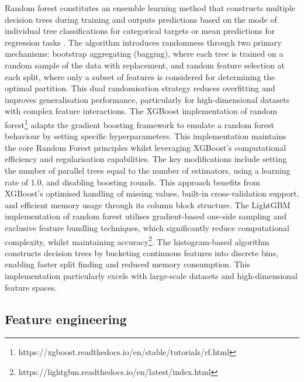 \documentclass[nhess, manuscript]{copernicus}
\begin{document}
Random forest constitutes an ensemble learning method that constructs multiple decision trees during training and outputs predictions based on the mode of individual tree classifications for categorical targets or mean predictions for regression tasks \citep{Liu_2012}. The algorithm introduces randomness through two primary mechanisms: bootstrap aggregating (bagging), where each tree is trained on a random sample of the data with replacement, and random feature selection at each split, where only a subset of features is considered for determining the optimal partition. This dual randomisation strategy reduces overfitting and improves generalisation performance, particularly for high-dimensional datasets with complex feature interactions. The XGBoost implementation of random forest\footnote{https://xgboost.readthedocs.io/en/stable/tutorials/rf.html} adapts the gradient boosting framework to emulate a random forest behaviour by setting specific hyperparameters. This implementation maintains the core Random Forest principles whilst leveraging XGBoost's computational efficiency and regularisation capabilities. The key modifications include setting the number of parallel trees equal to the number of estimators, using a learning rate of 1.0, and disabling boosting rounds. This approach benefits from XGBoost's optimised handling of missing values, built-in cross-validation support, and efficient memory usage through its column block structure. The LightGBM implementation of random forest utilises gradient-based one-side sampling and exclusive feature bundling techniques, which significantly reduce computational complexity, whilst maintaining accuracy\footnote{https://lightgbm.readthedocs.io/en/latest/index.html}. The histogram-based algorithm constructs decision trees by bucketing continuous features into discrete bins, enabling faster split finding and reduced memory consumption. This implementation particularly excels with large-scale datasets and high-dimensional feature spaces.


\subsection{Feature engineering}
\end{document}
